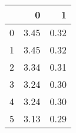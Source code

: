 \begin{tabular}{lrr}
\toprule
{} &     0 &     1 \\
\midrule
0 &  3.45 &  0.32 \\
1 &  3.45 &  0.32 \\
2 &  3.34 &  0.31 \\
3 &  3.24 &  0.30 \\
4 &  3.24 &  0.30 \\
5 &  3.13 &  0.29 \\
\bottomrule
\end{tabular}
